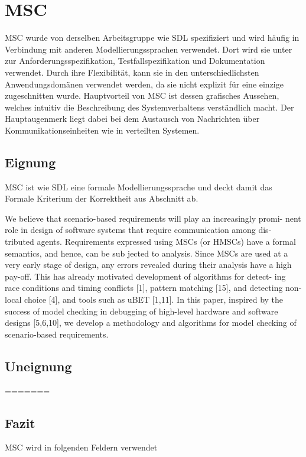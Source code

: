 \section{MSC}
\label{sc:MSCB}
\ac{MSC} wurde von derselben Arbeitsgruppe wie \ac{SDL} spezifiziert und wird häufig in Verbindung mit anderen Modellierungssprachen verwendet. Dort wird sie unter zur Anforderungsspezifikation, Testfallspezifikation und Dokumentation verwendet. Durch ihre Flexibilität, kann sie in den unterschiedlichsten Anwendungsdomänen verwendet werden, da sie nicht explizit für eine einzige zugeschnitten wurde. Hauptvorteil von \ac{MSC} ist dessen grafisches Aussehen, welches intuitiv die Beschreibung des Systemverhaltens verständlich macht. Der Hauptaugenmerk liegt dabei bei dem Austausch von Nachrichten über Kommunikationseinheiten wie in verteilten Systemen.
\subsection{Eignung}
\label{sc:MSCEignung}
\ac{MSC} ist wie \ac{SDL} eine formale Modellierungssprache und deckt damit das Formale Kriterium der Korrektheit aus Abschnitt \pageref{ssc:Korrektheit} ab. 



We believe that scenario-based requirements will play an increasingly promi-
nent role in design of software systems that require communication among dis-
tributed agents. Requirements expressed using MSCs (or HMSCs) have a formal
semantics, and hence, can be sub jected to analysis. Since MSCs are used at
a very early stage of design, any errors revealed during their analysis have a
high pay-off. This has already motivated development of algorithms for detect-
ing race conditions and timing conﬂicts [1], pattern matching [15], and detecting
non-local choice [4], and tools such as uBET [1,11]. In this paper, inspired by
the success of model checking in debugging of high-level hardware and software
designs [5,6,10], we develop a methodology and algorithms for model checking
of scenario-based requirements.
\subsection{Uneignung}
\label{sc:MSCUnEignung}
=======
\subsection{Fazit}
\label{sc:MSCFazit}



MSC wird in folgenden Feldern verwendet
